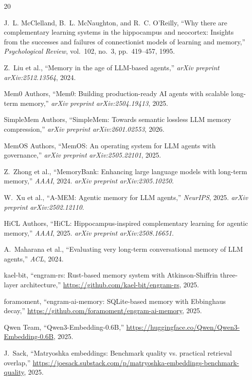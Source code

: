 \documentclass[11pt,a4paper]{article}
\begin{document}
\begin{thebibliography}{20}

J.~L. McClelland, B.~L. McNaughton, and R.~C. O'Reilly,
``Why there are complementary learning systems in the hippocampus and neocortex: Insights from the successes and failures of connectionist models of learning and memory,''
\emph{Psychological Review}, vol.~102, no.~3, pp.~419--457, 1995.

Z.~Liu et al.,
``Memory in the age of LLM-based agents,''
\emph{arXiv preprint arXiv:2512.13564}, 2024.

Mem0 Authors,
``Mem0: Building production-ready AI agents with scalable long-term memory,''
\emph{arXiv preprint arXiv:2504.19413}, 2025.

SimpleMem Authors,
``SimpleMem: Towards semantic lossless LLM memory compression,''
\emph{arXiv preprint arXiv:2601.02553}, 2026.

MemOS Authors,
``MemOS: An operating system for LLM agents with governance,''
\emph{arXiv preprint arXiv:2505.22101}, 2025.

Z.~Zhong et al.,
``MemoryBank: Enhancing large language models with long-term memory,''
\emph{AAAI}, 2024.
\emph{arXiv preprint arXiv:2305.10250}.

W.~Xu et al.,
``A-MEM: Agentic memory for LLM agents,''
\emph{NeurIPS}, 2025.
\emph{arXiv preprint arXiv:2502.12110}.

HiCL Authors,
``HiCL: Hippocampus-inspired complementary learning for agentic memory,''
\emph{AAAI}, 2025.
\emph{arXiv preprint arXiv:2508.16651}.

A.~Maharana et al.,
``Evaluating very long-term conversational memory of LLM agents,''
\emph{ACL}, 2024.

kael-bit,
``engram-rs: Rust-based memory system with Atkinson-Shiffrin three-layer architecture,''
\url{https://github.com/kael-bit/engram-rs}, 2025.

foramoment,
``engram-ai-memory: SQLite-based memory with Ebbinghaus decay,''
\url{https://github.com/foramoment/engram-ai-memory}, 2025.

Qwen Team,
``Qwen3-Embedding-0.6B,''
\url{https://huggingface.co/Qwen/Qwen3-Embedding-0.6B}, 2025.

J.~Sack,
``Matryoshka embeddings: Benchmark quality vs. practical retrieval overlap,''
\url{https://joesack.substack.com/p/matryoshka-embeddings-benchmark-quality}, 2025.


\end{thebibliography}
\end{document}
